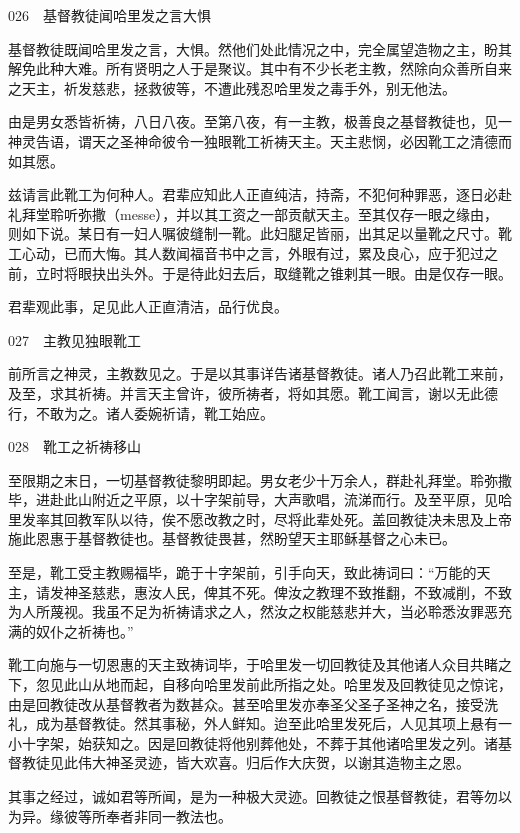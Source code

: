 \documentclass[12pt,UTF8]{ctexbook}
\begin{document}
026　基督教徒闻哈里发之言大惧

基督教徒既闻哈里发之言，大惧。然他们处此情况之中，完全属望造物之主，盼其解免此种大难。所有贤明之人于是聚议。其中有不少长老主教，然除向众善所自来之天主，祈发慈悲，拯救彼等，不遭此残忍哈里发之毒手外，别无他法。

由是男女悉皆祈祷，八日八夜。至第八夜，有一主教，极善良之基督教徒也，见一神灵告语，谓天之圣神命彼令一独眼靴工祈祷天主。天主悲悯，必因靴工之清德而如其愿。

兹请言此靴工为何种人。君辈应知此人正直纯洁，持斋，不犯何种罪恶，逐日必赴礼拜堂聆听弥撒（messe），并以其工资之一部贡献天主。至其仅存一眼之缘由，则如下说。某日有一妇人嘱彼缝制一靴。此妇腿足皆丽，出其足以量靴之尺寸。靴工心动，已而大悔。其人数闻福音书中之言，外眼有过，累及良心，应于犯过之前，立时将眼抉出头外。于是待此妇去后，取缝靴之锥剌其一眼。由是仅存一眼。

君辈观此事，足见此人正直清洁，品行优良。





027　主教见独眼靴工

前所言之神灵，主教数见之。于是以其事详告诸基督教徒。诸人乃召此靴工来前，及至，求其祈祷。并言天主曾许，彼所祷者，将如其愿。靴工闻言，谢以无此德行，不敢为之。诸人委婉祈请，靴工始应。





028　靴工之祈祷移山

至限期之末日，一切基督教徒黎明即起。男女老少十万余人，群赴礼拜堂。聆弥撒毕，进赴此山附近之平原，以十字架前导，大声歌唱，流涕而行。及至平原，见哈里发率其回教军队以待，俟不愿改教之时，尽将此辈处死。盖回教徒决未思及上帝施此恩惠于基督教徒也。基督教徒畏甚，然盼望天主耶稣基督之心未已。

至是，靴工受主教赐福毕，跪于十字架前，引手向天，致此祷词曰：“万能的天主，请发神圣慈悲，惠汝人民，俾其不死。俾汝之教理不致推翻，不致减削，不致为人所蔑视。我虽不足为祈祷请求之人，然汝之权能慈悲并大，当必聆悉汝罪恶充满的奴仆之祈祷也。”

靴工向施与一切恩惠的天主致祷词毕，于哈里发一切回教徒及其他诸人众目共睹之下，忽见此山从地而起，自移向哈里发前此所指之处。哈里发及回教徒见之惊诧，由是回教徒改从基督教者为数甚众。甚至哈里发亦奉圣父圣子圣神之名，接受洗礼，成为基督教徒。然其事秘，外人鲜知。迨至此哈里发死后，人见其项上悬有一小十字架，始获知之。因是回教徒将他别葬他处，不葬于其他诸哈里发之列。诸基督教徒见此伟大神圣灵迹，皆大欢喜。归后作大庆贺，以谢其造物主之恩。

其事之经过，诚如君等所闻，是为一种极大灵迹。回教徒之恨基督教徒，君等勿以为异。缘彼等所奉者非同一教法也。
\end{document}
